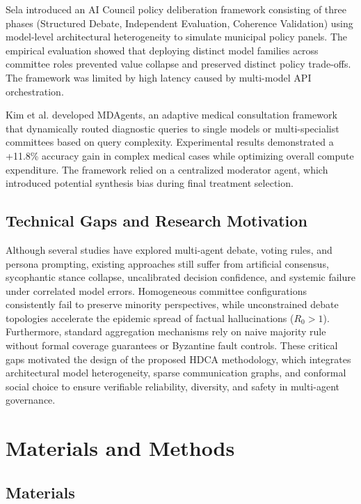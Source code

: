 \documentclass[a4paper,fleqn]{cas-sc}
\begin{document}
Sela \cite{30} introduced an AI Council policy deliberation framework consisting of three phases (Structured Debate, Independent Evaluation, Coherence Validation) using model-level architectural heterogeneity to simulate municipal policy panels. The empirical evaluation showed that deploying distinct model families across committee roles prevented value collapse and preserved distinct policy trade-offs. The framework was limited by high latency caused by multi-model API orchestration.

Kim et al. \cite{39} developed MDAgents, an adaptive medical consultation framework that dynamically routed diagnostic queries to single models or multi-specialist committees based on query complexity. Experimental results demonstrated a +11.8\% accuracy gain in complex medical cases while optimizing overall compute expenditure. The framework relied on a centralized moderator agent, which introduced potential synthesis bias during final treatment selection.

\subsection{Technical Gaps and Research Motivation}
Although several studies have explored multi-agent debate, voting rules, and persona prompting, existing approaches still suffer from artificial consensus, sycophantic stance collapse, uncalibrated decision confidence, and systemic failure under correlated model errors. Homogeneous committee configurations consistently fail to preserve minority perspectives, while unconstrained debate topologies accelerate the epidemic spread of factual hallucinations ($R_0 > 1$). Furthermore, standard aggregation mechanisms rely on naive majority rule without formal coverage guarantees or Byzantine fault controls. These critical gaps motivated the design of the proposed HDCA methodology, which integrates architectural model heterogeneity, sparse communication graphs, and conformal social choice to ensure verifiable reliability, diversity, and safety in multi-agent governance.

\section{Materials and Methods}
\label{sec:materials_methods}

\subsection{Materials}
\end{document}
